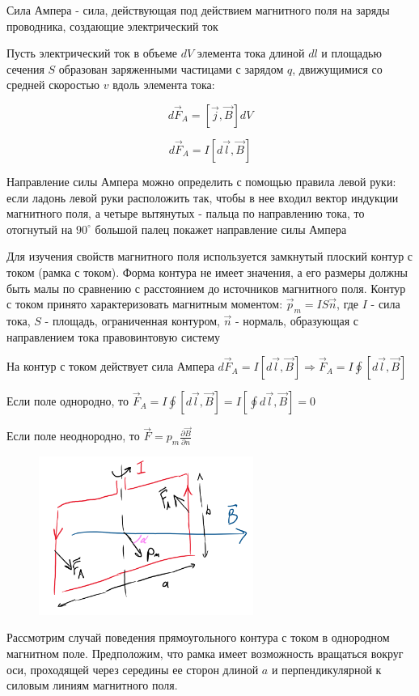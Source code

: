 \documentclass[12pt]{article}
\begin{document}
\Def Сила Ампера - сила, действующая под действием магнитного поля на заряды проводника, создающие электрический ток

Пусть электрический ток в объеме $dV$ элемента тока длиной $dl$ и площадью сечения $S$ образован заряженными частицами с зарядом
$q$, движущимися со средней скоростью $v$ вдоль элемента тока: 

\[d\vec{F}_A = [\vec{j}, \vec{B}] dV\]

\[d\vec{F}_A = I [d\vec{l}, \vec{B}]\]

Направление силы Ампера можно определить с помощью правила левой руки: если ладонь левой руки расположить так,
чтобы в нее входил вектор индукции магнитного поля, а четыре вытянутых - пальца по направлению тока, то отогнутый
на $90^\circ$ большой палец покажет направление силы Ампера

Для изучения свойств магнитного поля используется замкнутый плоский контур с током (рамка с током). Форма контура
не имеет значения, а его размеры должны быть малы по сравнению с расстоянием до источников магнитного поля.
Контур с током принято характеризовать магнитным моментом: $\vec{p}_m = I S \vec{n}$, где $I$ - сила тока, $S$ - площадь,
ограниченная контуром, $\vec{n}$ - нормаль, образующая с направлением тока правовинтовую систему

На контур с током действует сила Ампера $d\vec{F}_A = I[d\vec{l}, \vec{B}] \Longrightarrow \vec{F}_A = I \oint [d\vec{l}, \vec{B}]$

Если поле однородно, то $\vec{F}_A = I \oint [d\vec{l}, \vec{B}] = I [\oint d\vec{l}, \vec{B}] = 0$

Если поле неоднородно, то $\vec{F} = p_m \frac{\partial \vec{B}}{\partial n}$

\begin{figure}
    \includegraphics[width=7cm]{physics2/images/physics2_2025_02_24_2}
\end{figure}

\Ex Рассмотрим случай поведения прямоугольного контура с током в однородном магнитном поле. 
Предположим, что рамка имеет возможность вращаться вокруг оси, проходящей через середины ее
сторон длиной $a$ и перпендикулярной к силовым линиям магнитного поля.
\end{document}
